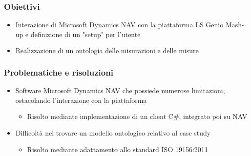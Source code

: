 \documentclass{beamer}
\begin{document}
\begin{frame}
\frametitle{Obiettivi}
\begin{itemize}
	\item Interazione di Microsoft Dynamics NAV con la piattaforma LS Genio Mash-up e definizione di un "setup" per l'utente
	
	
	\item Realizzazione di un ontologia delle misurazioni e delle misure
\end{itemize}	
\end{frame}

\begin{frame}
\frametitle{Problematiche e risoluzioni}
\begin{itemize}
\item Software Microsoft Dynamics NAV che possiede numerose limitazioni, ostacolando l'interazione con la piattaforma
\begin{itemize}
	\item Risolto mediante implementazione di un client C\#, integrato poi su NAV
\end{itemize}


\item Difficoltà nel trovare un modello ontologico relativo al case study
\begin{itemize}
	\item Risolto mediante adattamento allo standard ISO 19156:2011
\end{itemize}
\end{itemize}	
\end{frame}
\end{document}
